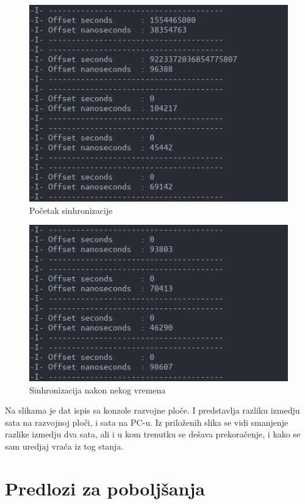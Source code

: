 \documentclass[a4paper,12pt, master]{etf}
\begin{document}
    \begin{figure}[htb]
			\centering
			\includegraphics[scale=1.8]{../pic/ptp_time_1.png}
            \caption{Po\v{c}etak sinhronizacije}
			\label{fig:ptp_time_1}
	\end{figure}

    \begin{figure}[htb]
			\centering
			\includegraphics[scale=2.1]{../pic/ptp_time_2.png}
            \caption{Sinhronizacija nakon nekog vremena}
			\label{fig:ptp_time_2}
	\end{figure}

	Na slikama je dat ispis sa konzole razvojne plo\v{c}e. I predstavlja
	razliku izmedju sata na razvojnoj plo\v{c}i, i sata na PC-u. Iz
	prilo\v{z}enih slika se vidi smanjenje razlike izmedju dva sata, ali i u
	kom trenutku se de\v{s}ava prekora\v{c}enje, i kako se sam uredjaj
	vra\'{c}a iz tog stanja.

	\section{Predlozi za pobolj\v{s}anja}
\end{document}
